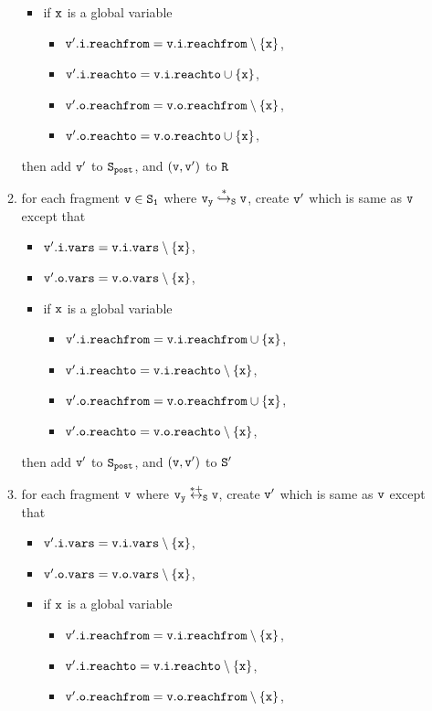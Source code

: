 \begin{itemize}
\begin{enumerate}
\begin{itemize}
\item if $\tt x$ is a global variable
\begin{itemize}
\item $\tt v'.i.reachfrom = v.i.reachfrom \setminus \{x\}$,
\item $\tt v'.i.reachto = v.i.reachto \cup \{x\}$,
\item $\tt v'.o.reachfrom = v.o.reachfrom \setminus \{x\}$,
\item $\tt v'.o.reachto = v.o.reachto \cup \{x\}$,
\end{itemize}
\end{itemize}
then add $\tt v'$ to $\tt S_{post}$, and $\tt (v,v')$ to $\tt R$
\item for each fragment $\tt v \in S_1$ where $\tt v_y \overset{*}\hookrightarrow_S v$, create $\tt v'$ which is same as $\tt v$ except that
\begin{itemize}
\item $\tt v'.i.vars = v.i.vars \setminus \{x\}$,
\item $\tt v'.o.vars = v.o.vars \setminus \{x\}$,
\item if $\tt x$ is a global variable
\begin{itemize}
\item $\tt v'.i.reachfrom = v.i.reachfrom \cup \{x\}$,
\item $\tt v'.i.reachto = v.i.reachto \setminus \{x\}$,
 \item $\tt v'.o.reachfrom = v.o.reachfrom \cup \{x\}$,
 \item $\tt v'.o.reachto = v.o.reachto \setminus \{x\}$,
\end{itemize}
\end{itemize}
then add $\tt v'$ to $\tt S_{post}$, and $\tt (v,v')$ to $\tt S'$
\item for each fragment $\tt v$ where $\tt v_y \overset{*+}\leftrightarrow_S v$, create $\tt v'$ which is same as $\tt v$ except that
\begin{itemize}
\item $\tt v'.i.vars = v.i.vars \setminus \{x\}$,
\item $\tt v'.o.vars = v.o.vars \setminus \{x\}$,
\item if $\tt x$ is a global variable
\begin{itemize}
\item $\tt v'.i.reachfrom = v.i.reachfrom \setminus \{x\}$,
\item $\tt v'.i.reachto = v.i.reachto \setminus \{x\}$,
\item $\tt v'.o.reachfrom = v.o.reachfrom \setminus \{x\}$,

\end{itemize}
\end{itemize}
\end{enumerate}
\end{itemize}
